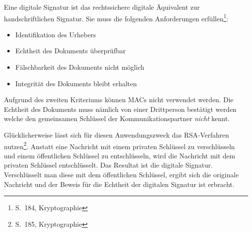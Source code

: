 Eine digitale Signatur ist das rechtssichere digitale Äquivalent zur
handschriftlichen Signatur.  Sie muss die folgenden Anforderungen
erfüllen\footnote{S.~184, Kryptographie}:

\begin{itemize}
\item Identifikation des Urhebers
\item Echtheit des Dokuments überprüfbar
\item Fälschbarkeit des Dokuments nicht möglich
\item Integrität des Dokuments bleibt erhalten
\end{itemize}

Aufgrund des zweiten Kriteriums können \ac{MAC}s nicht verwendet
werden.  Die Echtheit des Dokuments muss nämlich von einer Drittperson
bestätigt werden welche den gemeinsamen Schlüssel der
Kommunikationspartner \emph{nicht} kennt.

Glücklicherweise lässt sich für diesen Anwendungszweck das
\ac{RSA}-Verfahren nutzen\footnote{S.~185, Kryptographie}.  Anstatt
eine Nachricht mit einem privaten Schlüssel zu verschlüsseln und einem
öffentlichen Schlüssel zu entschlüsseln, wird die Nachricht mit dem
privaten Schlüssel entschlüsselt.  Das Resultat ist die digitale
Signatur.  Verschlüsselt man diese mit dem öffentlichen Schlüssel,
ergibt sich die originale Nachricht und der Beweis für die Echtheit
der digitalen Signatur ist erbracht.

